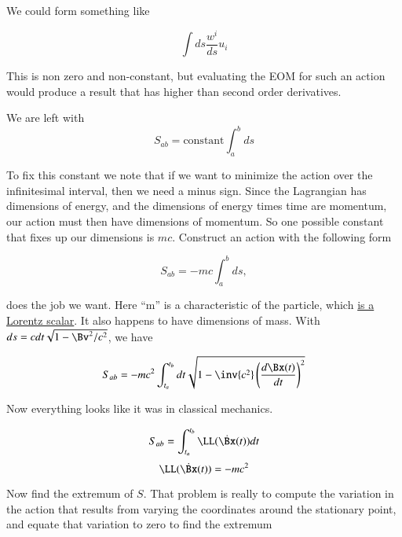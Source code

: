 We could form something like

\begin{equation}\label{eqn:relativisticElectrodynamicsL7:170}
\int ds \frac{w^i}{ds} u_i
\end{equation}

This is non zero and non-constant, but evaluating the EOM for such an action would produce a result that has higher than second order derivatives.

We are left with
\begin{equation}\label{eqn:relativisticElectrodynamicsL7:180}
S_{ab} = \text{constant} \int_a^b ds 
\end{equation}

To fix this constant we note that if we want to minimize the action over the infinitesimal interval, then we need a minus sign.  Since the Lagrangian has dimensions of energy, and the dimensions of energy times time are momentum, our action must then have dimensions of momentum.  So one possible constant that fixes up our dimensions is $mc$.  Construct an action with the following form

\begin{equation}\label{eqn:relativisticElectrodynamicsL7:190}
S_{ab} = - m c\int_a^b ds,
\end{equation}

does the job we want.  Here ``m'' is a characteristic of the particle, which \underline{is a Lorentz scalar}.  It also happens to have dimensions of mass.  With $ds = c dt \sqrt{1 - \Bv^2/c^2}$, we have

\begin{equation}\label{eqn:relativisticElectrodynamicsL7:200}
S_{ab} = - m c^2 \int_{t_a}^{t_b} dt \sqrt{ 1 - \inv{c^2} \left( \frac{d \Bx(t) }{dt} \right)^2 }
\end{equation}

Now everything looks like it was in classical mechanics.

\begin{equation}\label{eqn:relativisticElectrodynamicsL7:210}
S_{ab} = \int_{t_a}^{t_b} \LL(\dot{\Bx}(t)) dt
\end{equation}
\begin{equation}\label{eqn:relativisticElectrodynamicsL7:220}
\LL(\dot{\Bx}(t)) = -m c^2 
\end{equation}

Now find the extremum of $S$.  That problem is really to compute the variation in the action that results from varying the coordinates around the stationary point, and equate that variation to zero to find the extremum

